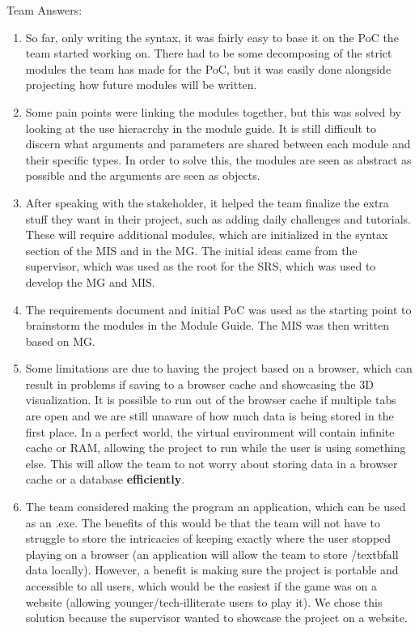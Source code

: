 \documentclass[12pt, titlepage]{article}
\begin{document}
Team Answers:
\begin {enumerate}
  \item So far, only writing the syntax, it was fairly easy to base it on the PoC the team started working on. There had to be some decomposing of the strict modules the team has made for the PoC, but it was easily done alongside projecting how future modules will be written.
  \item Some pain points were linking the modules together, but this was solved by looking at the use hieracrchy in the module guide. It is still difficult to discern what arguments and parameters are shared between each module and their specific types. In order to solve this, the modules are seen as abstract as possible and the arguments are seen as objects.
  \item After speaking with the stakeholder, it helped the team finalize the extra stuff they want in their project, such as adding daily challenges and tutorials. These will require additional modules, which are initialized in the syntax section of the MIS and in the MG. The initial ideas came from the supervisor, which was used as the root for the SRS, which was used to develop the MG and MIS.
  \item The requirements document and initial PoC was used as the starting point to brainstorm the modules in the Module Guide. The MIS was then written based on MG.
  \item Some limitations are due to having the project based on a browser, which can result in problems if saving to a browser cache and showcasing the 3D visualization. It is possible to run out of the browser cache if multiple tabs are open and we are still unaware of how much data is being stored in the first place. In a perfect world, the virtual environment will contain infinite cache or RAM, allowing the project to run while the user is using something else. This will allow the team to not worry about storing data in a browser cache or a database \textbf{efficiently}.
  \item The team considered making the program an application, which can be used as an .exe. The benefits of this would be that the team will not have to struggle to store the intricacies of keeping exactly where the user stopped playing on a browser (an application will allow the team to store /textbf{all} data locally). However, a benefit is making sure the project is portable and accessible to all users, which would be the easiest if the game was on a website (allowing younger/tech-illiterate users to play it). We chose this solution because the supervisor wanted to showcase the project on a website.
\end{enumerate}
\end{document}
